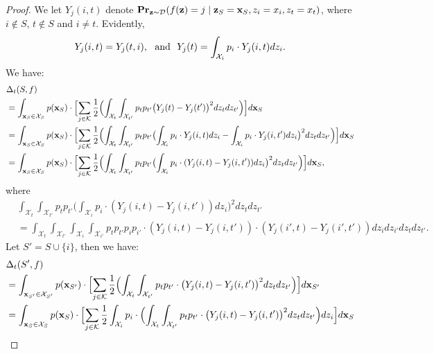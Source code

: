 \documentclass{article}
\newcommand{\z}{\textbf{z}}
\newcommand{\x}{\textbf{x}}
\newcommand{\fml}[1]{{\mathcal{#1}}}
\newcommand{\mbf}[1]{\ensuremath\mathbf{#1}}
\begin{document}
\begin{proof}
We let $Y_{j}(i,t)$ denote $\mbf{Pr}_{\z\sim \mathcal{D}}(f(\z) = j \mid \z_{S} = \x_{S}, z_i = x_i, z_t = x_t)$, where $i\not\in S$, $t\not\in S$ and $i \neq t$.
Evidently,
\[
Y_{j}(i,t) = Y_{j}(t,i),~~\textnormal{and}~~Y_{j}(t) = \int_{\fml{X}_{i}} p_{i} \cdot Y_{j}(i,t) dz_i.
\]
%
We have:
\begin{equation}
\begin{aligned}
&\Delta_{t}(S,f) \\
&= \int_{\x_{S} \in \fml{X}_{S}} p(\x_{S}) \cdot \Bigl[ \sum_{j\in \fml{K}} \frac{1}{2} \Bigl(
\int_{\fml{X}_t} \int_{\fml{X}_{t'}} p_{t} p_{t'} \bigl(Y_{j}(t) - Y_{j}(t')\bigr)^2 dz_t dz_{t'} \Bigr) \Bigr] d\x_{S} \\
%
&= \int_{\x_{S} \in \fml{X}_{S}} p(\x_{S}) \cdot \Bigl[ \sum_{j\in \fml{K}} \frac{1}{2} \Bigl(
\int_{\fml{X}_t} \int_{\fml{X}_{t'}} p_{t} p_{t'} \bigl(\int_{\fml{X}_{i}} p_{i} \cdot Y_{j}(i,t) dz_i - \int_{\fml{X}_{i}} p_{i} \cdot Y_{j}(i,t') dz_i \bigr)^2 dz_t dz_{t'} \Bigr) \Bigr] d\x_{S} \\
%
&= \int_{\x_{S} \in \fml{X}_{S}} p(\x_{S}) \cdot \Bigl[ \sum_{j\in \fml{K}} \frac{1}{2} \Bigl(
\int_{\fml{X}_t} \int_{\fml{X}_{t'}} p_{t} p_{t'} \bigl(\int_{\fml{X}_{i}} p_{i} \cdot (Y_{j}(i,t) - Y_{j}(i,t')) dz_i \bigr)^2 dz_t dz_{t'} \Bigr) \Bigr] d\x_{S},
\end{aligned}
\end{equation}
where
\begin{align*}
&\int_{\fml{X}_t} \int_{\fml{X}_{t'}} p_{t} p_{t'} \bigl(\int_{\fml{X}_{i}} p_{i} \cdot (Y_{j}(i,t) - Y_{j}(i,t')) dz_i \bigr)^2 dz_t dz_{t'} \\
&= \int_{\fml{X}_t} \int_{\fml{X}_{t'}} \int_{\fml{X}_{i}} \int_{\fml{X}_{i'}} p_{t} p_{t'} p_{i} p_{i'} \cdot
(Y_{j}(i,t) - Y_{j}(i,t')) \cdot (Y_{j}(i',t) - Y_{j}(i',t')) dz_i dz_{i'} dz_t dz_{t'}.
\end{align*}
%
Let $S' = S\cup\{i\}$, then we have:
\begin{equation}
\begin{aligned}
&\Delta_{t}(S',f) \\
&= \int_{\x_{S'} \in \fml{X}_{S'}} p(\x_{S'}) \cdot \Bigl[ \sum_{j\in \fml{K}} \frac{1}{2} \Bigl(
\int_{\fml{X}_t} \int_{\fml{X}_{t'}} p_{t} p_{t'} \cdot \bigl(Y_{j}(i,t) - Y_{j}(i,t')\bigr)^2 dz_t dz_{t'} \Bigr) \Bigr] d\x_{S'} \\
%
&= \int_{\x_{S} \in \fml{X}_{S}} p(\x_{S}) \cdot \Bigl[ \sum_{j\in \fml{K}} \frac{1}{2} \int_{\fml{X}_i} p_{i} \cdot \Bigl(
\int_{\fml{X}_t} \int_{\fml{X}_{t'}} p_{t} p_{t'} \cdot \bigl(Y_{j}(i,t) - Y_{j}(i,t')\bigr)^2 dz_t dz_{t'} \Bigr) dz_i \Bigr] d\x_{S} \\

\end{aligned}
\end{equation}
\end{proof}
\end{document}
